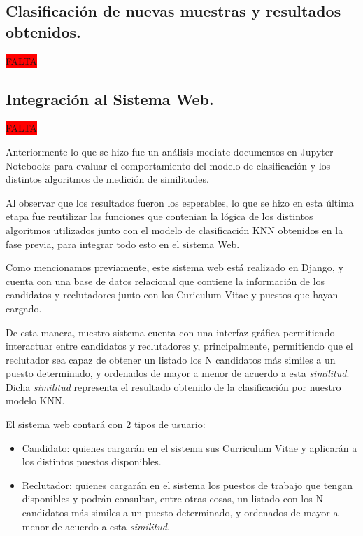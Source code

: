 \documentclass[12pt,a4paper]{article}
\begin{document}
\begin{sloppypar}
\cleardoublepage

\subsection{Clasificación de nuevas muestras y resultados obtenidos.}\label{5.4.Predicciondenuevasmuestrasyresultadosobtenidos}

\colorbox{red}{FALTA}

\cleardoublepage

\subsection{Integración al Sistema Web.}\label{5.5.IntegracionalSistemaWeb}
\colorbox{red}{FALTA}

Anteriormente lo que se hizo fue un análisis mediate documentos en Jupyter Notebooks para evaluar el comportamiento del modelo de clasificación y los distintos algoritmos de medición de similitudes. 

Al observar que los resultados fueron los esperables, lo que se hizo en esta última etapa fue reutilizar las funciones que contenian la lógica de los distintos algoritmos utilizados junto con el modelo de clasificación KNN obtenidos en la fase previa, para integrar todo esto en el sistema Web. 

Como mencionamos previamente, este sistema web está realizado en Django, y cuenta con una base de datos relacional que contiene la información de los candidatos y reclutadores junto con los Curiculum Vitae y puestos que hayan cargado. 

De esta manera, nuestro sistema cuenta con una interfaz gráfica permitiendo interactuar entre candidatos y reclutadores y, principalmente, permitiendo que el reclutador sea capaz de obtener un listado los N candidatos más similes a un puesto determinado, y ordenados de mayor a menor de acuerdo a esta \textit{similitud}. Dicha \textit{similitud} representa el resultado obtenido de la clasificación por nuestro modelo KNN.

El sistema web contará con 2 tipos de usuario: 
\begin{itemize}
\item Candidato: quienes cargarán en el sistema sus Curriculum Vitae y aplicarán a los distintos puestos disponibles.
\item Reclutador: quienes cargarán en el sistema los puestos de trabajo que tengan disponibles y podrán consultar, entre otras cosas, un listado con los N candidatos más similes a un puesto determinado, y ordenados de mayor a menor de acuerdo a esta \textit{similitud}.
\end{itemize}


\end{sloppypar}
\end{document}
